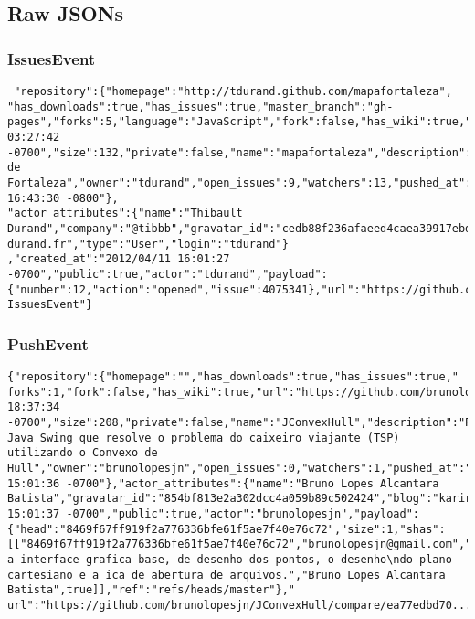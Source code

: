 \documentclass[a4paper,10pt]{article}
\begin{document}
\subsection{Raw JSONs}
\subsubsection{IssuesEvent}

\begin{lstlisting}
 "repository":{"homepage":"http://tdurand.github.com/mapafortaleza",
"has_downloads":true,"has_issues":true,"master_branch":"gh-pages","forks":5,"language":"JavaScript","fork":false,"has_wiki":true,"url":"https://github.com/tdurand/mapafortaleza","created_at":"2011/09/29 03:27:42 -0700","size":132,"private":false,"name":"mapafortaleza","description":"Mapa de Fortaleza","owner":"tdurand","open_issues":9,"watchers":13,"pushed_at":"2012/02/29 16:43:30 -0800"},
"actor_attributes":{"name":"Thibault Durand","company":"@tibbb","gravatar_id":"cedb88f236afaeed4caea39917ebd0a7","blog":"http://www.thibault-durand.fr","type":"User","login":"tdurand"}
,"created_at":"2012/04/11 16:01:27 -0700","public":true,"actor":"tdurand","payload":{"number":12,"action":"opened","issue":4075341},"url":"https://github.com/tdurand/mapafortaleza/issues/12","type":"
IssuesEvent"}
\end{lstlisting}

\subsubsection{PushEvent}

\begin{lstlisting}
{"repository":{"homepage":"","has_downloads":true,"has_issues":true,"
forks":1,"fork":false,"has_wiki":true,"url":"https://github.com/brunolopesjn/JConvexHull","created_at":"2012/04/10 18:37:34 -0700","size":208,"private":false,"name":"JConvexHull","description":"Programa Java Swing que resolve o problema do caixeiro viajante (TSP) utilizando o Convexo de Hull","owner":"brunolopesjn","open_issues":0,"watchers":1,"pushed_at":"2012/04/11 15:01:36 -0700"},"actor_attributes":{"name":"Bruno Lopes Alcantara Batista","gravatar_id":"854bf813e2a302dcc4a059b89c502424","blog":"kariridev.blogspot.com","type":"User","login":"brunolopesjn","email":"brunolopesjn@gmail.com"},"created_at":"2012/04/11 15:01:37 -0700","public":true,"actor":"brunolopesjn","payload":{"head":"8469f67ff919f2a776336bfe61f5ae7f40e76c72","size":1,"shas":[["8469f67ff919f2a776336bfe61f5ae7f40e76c72","brunolopesjn@gmail.com","Criado a interface grafica base, de desenho dos pontos, o desenho\ndo plano cartesiano e a ica de abertura de arquivos.","Bruno Lopes Alcantara Batista",true]],"ref":"refs/heads/master"},"
url":"https://github.com/brunolopesjn/JConvexHull/compare/ea77edbd70...8469f67ff9","type":"PushEvent"}
\end{lstlisting}
\end{document}

